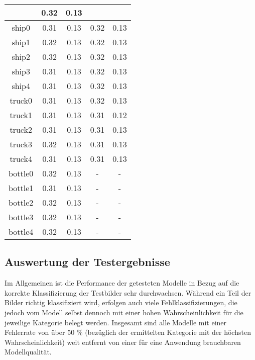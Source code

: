 \begin{longtable} {| c | c | c | c | c |}
& 0.32 	
& 0.13\\
 \hline
ship0 \cellcolor{light-gray}	
& 0.31	
& 0.13
& 0.32 	
& 0.13\\
 \hline
ship1 \cellcolor{light-gray}	
& 0.32	
& 0.13
& 0.32 	
& 0.13\\
 \hline
ship2 \cellcolor{light-gray}	
& 0.32	
& 0.13
& 0.32 	
& 0.13\\
 \hline
ship3 \cellcolor{light-gray}	
& 0.31	
& 0.13
& 0.32 	
& 0.13\\
 \hline
ship4 \cellcolor{light-gray}	
& 0.31	
& 0.13
& 0.32 	
& 0.13\\
 \hline
truck0 \cellcolor{light-gray}	
& 0.31	
& 0.13
& 0.32 	
& 0.13\\
 \hline
truck1 \cellcolor{light-gray}	
& 0.31	
& 0.13
& 0.31 	
& 0.12\\
 \hline
truck2 \cellcolor{light-gray}	
& 0.31	
& 0.13
& 0.31 	
& 0.13\\
 \hline
truck3 \cellcolor{light-gray}	
& 0.32	
& 0.13
& 0.31 	
& 0.13\\
 \hline
truck4 \cellcolor{light-gray}		
& 0.31	
& 0.13
& 0.31 	
& 0.13\\
 \hline
bottle0\cellcolor{light-gray} 	
& 0.32
& 0.13
&  -	 & - \\
 \hline
bottle1\cellcolor{light-gray} 	
& 0.31
& 0.13
&  -	 & - \\
 \hline
bottle2\cellcolor{light-gray} 	
& 0.32
& 0.13
&  -	 & - \\
 \hline
bottle3\cellcolor{light-gray} 	
& 0.32
& 0.13
&  -	 & - \\
 \hline
bottle4\cellcolor{light-gray}
& 0.32
& 0.13	
&  -	 & - \\
 \hline
\end{longtable}

\subsection{Auswertung der Testergebnisse}

Im Allgemeinen ist die Performance der getesteten Modelle in Bezug auf die korrekte Klassifizierung der Testbilder sehr durchwachsen. Während ein Teil der Bilder richtig klassifiziert wird, erfolgen auch viele Fehlklassifizierungen, die jedoch vom Modell selbst dennoch mit einer hohen Wahrscheinlichkeit für die jeweilige Kategorie belegt werden. Insgesamt sind alle Modelle mit einer Fehlerrate von über 50 \% (bezüglich der ermittelten Kategorie mit der höchsten Wahrscheinlichkeit) weit entfernt von einer für eine Anwendung brauchbaren Modellqualität.

